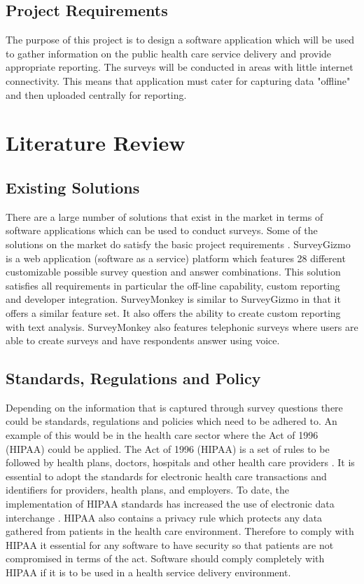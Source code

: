 \documentclass[12pt]{witseiepaper}
\begin{document}
\subsection{Project Requirements}

The purpose of this project is to design a software application which will be used to gather information on the public health care service delivery and provide appropriate reporting. The surveys will be conducted in areas with little internet connectivity. This means that application must cater for capturing data "offline" and then uploaded centrally for reporting.\\

\section{Literature Review}
\subsection{Existing Solutions}

There are a large number of solutions that exist in the market in terms of software applications which can be used to conduct surveys. Some of the solutions on the market do satisfy the basic project requirements \cite{ReviewSurvey}. SurveyGizmo \cite{SurveyGizmo} is a web application (software as a service) platform which features 28 different customizable possible survey question and answer combinations. This solution satisfies all requirements in particular the off-line capability, custom reporting and developer integration. SurveyMonkey \cite{SurveyMonkey} is similar to SurveyGizmo in that it offers a similar feature set. It also offers the ability to create custom reporting with text analysis. SurveyMonkey also features telephonic surveys where users are able to create surveys and have respondents answer using voice. 

\subsection{Standards, Regulations and Policy}
Depending on the information that is captured through survey questions there could be standards, regulations and policies which need to be adhered to. An example of this would be in the health care sector where the Act of 1996 (HIPAA) could be applied. The Act of 1996 (HIPAA) is a set of rules to be followed by health plans, doctors, hospitals and other health care providers \cite{HIPAA}. It is essential to adopt the standards for electronic health care transactions and identifiers for providers, health plans, and employers. To date, the implementation of HIPAA standards has increased the use of electronic data interchange \cite{HIPAA}. HIPAA also contains a privacy rule which protects any data gathered from patients in the health care environment. Therefore to comply with HIPAA it essential for any software to have security so that patients are not compromised in terms of the act. Software should comply completely with HIPAA if it is to be used in a health service delivery environment. \\
\end{document}
